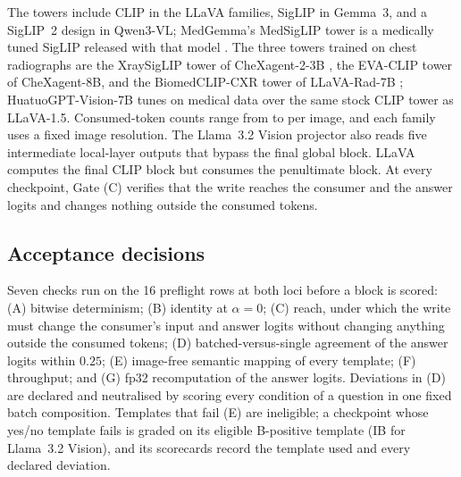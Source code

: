 \documentclass{article}
\begin{document}
The towers include CLIP \citep{radford2021clip} in the LLaVA families, SigLIP \citep{zhai2023siglip} in Gemma~3, and a SigLIP~2 design \citep{tschannen2025siglip2} in Qwen3-VL; MedGemma's MedSigLIP tower is a medically tuned SigLIP released with that model \citep{sellergren2025medgemma}. The three towers trained on chest radiographs are the XraySigLIP tower of CheXagent-2-3B \citep{chen2024chexagent}, the EVA-CLIP tower \citep{sun2023evaclip} of CheXagent-8B, and the BiomedCLIP-CXR tower of LLaVA-Rad-7B \citep{zhang2025biomedclip,zambranochaves2025llavarad}; HuatuoGPT-Vision-7B tunes on medical data over the same stock CLIP tower as LLaVA-1.5. Consumed-token counts range from \cfTokensMin{} to \cfTokensMax{} per image, and each family uses a fixed image resolution. The Llama~3.2 Vision projector also reads five intermediate local-layer outputs that bypass the final global block. LLaVA computes the final CLIP block but consumes the penultimate block. At every checkpoint, Gate (C) verifies that the write reaches the consumer and the answer logits and changes nothing outside the consumed tokens.

\subsection{Acceptance decisions}
\label{app:cf-gates}

Seven checks run on the 16 preflight rows at both loci before a block is scored: (A) bitwise determinism; (B) identity at $\alpha=0$; (C) reach, under which the write must change the consumer's input and answer logits without changing anything outside the consumed tokens; (D) batched-versus-single agreement of the answer logits within $0.25$; (E) image-free semantic mapping of every template; (F) throughput; and (G) fp32 recomputation of the answer logits. Deviations in (D) are declared and neutralised by scoring every condition of a question in one fixed batch composition. Templates that fail (E) are ineligible; a checkpoint whose yes/no template fails is graded on its eligible B-positive template (IB for Llama~3.2 Vision), and its scorecards record the template used and every declared deviation.
\end{document}
